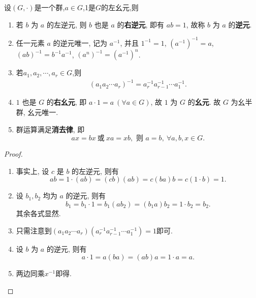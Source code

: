 \documentclass[../../main.tex]{subfiles}%
\begin{document}
\begin{theorem}[群的基本性质]\label{theorem:抽象代数--群的基本性质}
设$(G,\cdot)$是一个群,$a\in G$,1是$G$的左幺元,则
\begin{enumerate}[(1)]
\item 若 \( b \) 为 \( a \) 的左逆元, 则 \( b \) 也是 \( a \) 的\textbf{右逆元}, 即有 \( ab = 1 \), 故称 \( b \) 为 \( a \) 的\textbf{逆元}.

\item 任一元素 \( a \) 的逆元唯一, 记为 \( a^{-1} \), 并且 \( 1^{-1} = 1 \), \( (a^{-1})^{-1} = a \), \( (ab)^{-1} = b^{-1}a^{-1} \), \( (a^n)^{-1} = (a^{-1})^n \).

\item 若$a_1,a_2,\cdots,a_r\in G$,则
\begin{align*}
(a_1a_2\cdots a_r)^{-1}=a_r^{-1}a_{r-1}^{-1}\cdots a_1^{-1}.
\end{align*}

\item \( 1 \) 也是 \( G \) 的\textbf{右幺元}, 即 \( a \cdot 1 = a \ (\forall a \in G) \), 故 \( 1 \) 为 \( G \) 的\textbf{幺元}. 故 \( G \) 为幺半群, 幺元唯一.

\item\label{theorem:抽象代数--群的基本性质-4} 群运算满足\textbf{消去律}, 即
\[
ax = bx \ \text{或}\ xa = xb, \text{ 则 } a = b, \ \forall a, b, x \in G.
\]
\end{enumerate}
\end{theorem}
\begin{proof}
\begin{enumerate}[(1)]
\item 事实上, 设 \( c \) 是 \( b \) 的左逆元, 则有
\[
ab = 1 \cdot (ab) = (cb)(ab) = c(ba)b = c(1 \cdot b) = 1.
\]

\item 设 \( b_1, b_2 \) 均为 \( a \) 的逆元, 则有
\[
b_1 = b_1 \cdot 1 = b_1(ab_2) = (b_1a)b_2 = 1 \cdot b_2 = b_2.
\]
其余各式显然.

\item 只需注意到$(a_1a_2\cdots a_r)(a_r^{-1}a_{r-1}^{-1}\cdots a_1^{-1})=1$即可.

\item 设 \( b \) 为 \( a \) 的逆元, 则有
\[
a \cdot 1 = a(ba) = (ab)a = 1 \cdot a = a.
\]

\item 两边同乘$x^{-1}$即得.
\end{enumerate}
\end{proof}
\end{document}
